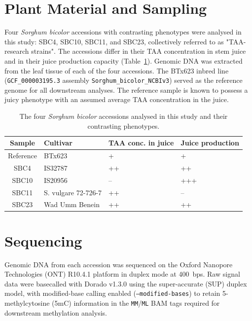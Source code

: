 \section{Plant Material and Sampling}
\hspace{1em}Four \textit{Sorghum bicolor} accessions with contrasting phenotypes were analysed in this study: SBC4, SBC10, SBC11, and SBC23, collectively referred to as "TAA-research strains". The accessions differ in their TAA concentration in stem juice and in their juice production capacity (Table~\ref{tab:samples}). Genomic DNA was extracted from the leaf tissue of each of the four accessions. The BTx623 inbred line (\texttt{GCF\_000003195.3} assembly \texttt{Sorghum\_bicolor\_NCBIv3}) served as the reference genome for all downstream analyses. The reference sample is known to possess a juicy phenotype \cite{zhangSweetSorghumOriginated2018} with an assumed average TAA concentration in the juice.

\begin{table}[h]
    \centering
    \caption{The four \textit{Sorghum bicolor} accessions analysed in this study and their contrasting phenotypes.}
    \label{tab:samples}
    \begin{tabularx}{\textwidth}{c >{\centering\arraybackslash}X >{\centering\arraybackslash}X >{\centering\arraybackslash}X}
        \toprule
        Sample & Cultivar & TAA conc. in juice & Juice production \\
        \midrule
        Reference & BTx623 & + & + \\
        SBC4 & IS32787 & ++ & ++ \\
        SBC10 & IS20956 & -- & +++ \\
        SBC11 & S. vulgare 72-726-7 & ++ & -- \\
        SBC23 & 240 Wad Umm Benein & ++ & ++ \\
        \bottomrule
    \end{tabularx}
\end{table}

\section{Sequencing}
\hspace{1em}Genomic DNA from each accession was sequenced on the Oxford Nanopore Technologies (ONT) R10.4.1 platform in duplex mode at 400~bps. Raw signal data were basecalled with Dorado v1.3.0 using the super-accurate (SUP) duplex model, with modified-base calling enabled (\texttt{--modified-bases}) to retain 5-methylcytosine (5mC) information in the \texttt{MM}/\texttt{ML} BAM tags required for downstream methylation analysis.

